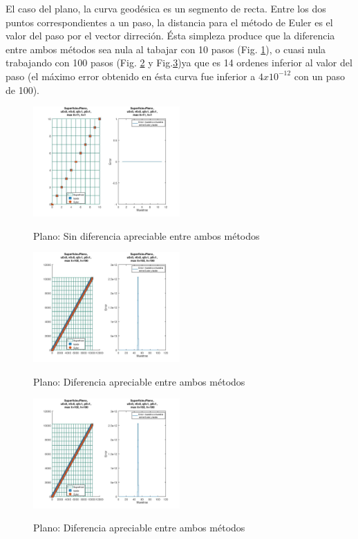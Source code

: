 \documentclass{endm}
\begin{document}
El caso del plano, la curva geod\'esica es un segmento de recta. Entre los dos puntos correspondientes a un paso, la distancia para el método de Euler es el valor del paso por el vector dirreci\'on. \'Esta simpleza produce que la diferencia entre ambos m\'etodos sea nula al tabajar con 10 pasos (Fig. \ref{fig:plano}), o cuasi nula trabajando con 100 pasos (Fig. \ref{fig:planoh100} y Fig.\ref{fig:planoh100q03})ya que es 14 ordenes inferior al valor del paso (el m\'aximo error obtenido en \'esta curva fue inferior a $4x10^{-12}$ con un paso de 100).
\begin{figure}[H]
\caption{Plano: Sin diferencia apreciable entre ambos m\'etodos}
\centering
\includegraphics[width=0.5\textwidth]{plano.jpg}
\label{fig:plano}
\end{figure}

\begin{figure}[H]
\caption{Plano: Diferencia apreciable entre ambos m\'etodos }
\centering
\includegraphics[width=0.5\textwidth]{planoh100.jpg}
\label{fig:planoh100}
\end{figure}

\begin{figure}[H]
\caption{Plano: Diferencia apreciable entre ambos m\'etodos }
\centering
\includegraphics[width=0.5\textwidth]{planoh100.jpg}
\label{fig:planoh100q03}
\end{figure}
\end{document}
